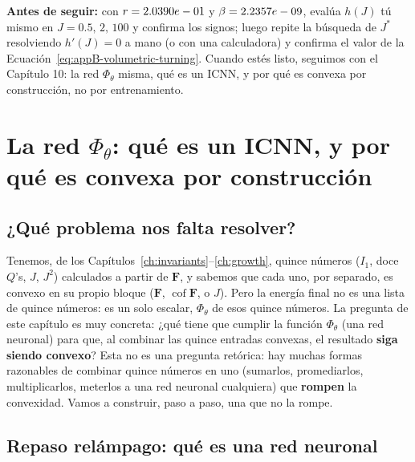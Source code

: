 \documentclass[11pt,a4paper]{article}
\newcommand{\Cof}{\operatorname{cof}}
\begin{document}
\bigskip
\noindent\textbf{Antes de seguir:} con $r=2.0390e-01{}$ y
$\beta=2.2357e-09{}$, eval\'ua $h(J)$ t\'u mismo en
$J=0.5,\,2,\,100$ y confirma los signos; luego repite la
b\'usqueda de $J^\ast$ resolviendo $h'(J)=0$ a mano (o con una
calculadora) y confirma el valor de la Ecuaci\'on~\eqref{eq:appB-volumetric-turning}.
Cuando est\'es listo, seguimos con el Cap\'itulo 10: la red
$\Phi_\theta$ misma, qu\'e es un ICNN, y por qu\'e es convexa por
construcci\'on, no por entrenamiento.

\section{La red $\Phi_\theta$: qu\'e es un ICNN, y por qu\'e es convexa por construcci\'on}
\label{ch:icnn}

\subsection{¿Qu\'e problema nos falta resolver?}

Tenemos, de los Cap\'itulos~\ref{ch:invariants}--\ref{ch:growth}, quince
n\'umeros ($I_1$, doce $Q$'s, $J$, $J^2$) calculados a partir de $\bm F$,
y sabemos que cada uno, por separado, es convexo en su propio bloque
($\bm F$, $\Cof\bm F$, o $J$). Pero la energ\'ia final no es una lista de
quince n\'umeros: es un solo escalar, $\Phi_\theta$ de esos quince
n\'umeros. La pregunta de este cap\'itulo es muy concreta: ¿qu\'e
tiene que cumplir la funci\'on $\Phi_\theta$ (una red neuronal) para que,
al combinar las quince entradas convexas, el resultado \textbf{siga
siendo convexo}? Esta no es una pregunta ret\'orica: hay muchas formas
razonables de combinar quince n\'umeros en uno (sumarlos, promediarlos,
multiplicarlos, meterlos a una red neuronal cualquiera) que
\textbf{rompen} la convexidad. Vamos a construir, paso a paso, una que
no la rompe.

\subsection{Repaso rel\'ampago: qu\'e es una red neuronal}
\end{document}
